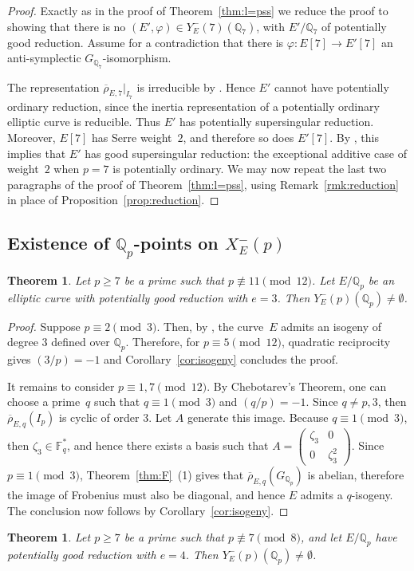 \documentclass[12pt]{amsart}
\numberwithin{equation}{section}
\newtheorem{theorem}[equation]{Theorem}
\theoremstyle{definition}
\newcommand{\F}{\mathbb{F}}
\newcommand{\Q}{\mathbb{Q}}
\newcommand{\rhobar}{{\overline{\rho}}}
\newcommand{\Xp}{X_E^{-}(p)}
\begin{document}
\begin{proof}
Exactly as in the proof of Theorem~\ref{thm:l=pss} we reduce the proof to showing that there is no 
$(E',\varphi)\in Y_E^-(7)(\Q_7)$, with $E'/\Q_7$ of potentially good reduction. Assume for a contradiction that there is $\varphi:E[7] \to E'[7]$ an anti-symplectic $G_{\Q_7}$-isomorphism.

The representation \(\overline{\rho}_{E,7}|_{I_7}\)  is irreducible by
\cite[Proposition~12]{Serre2}. Hence $E'$ cannot have potentially
ordinary reduction, since the inertia representation of a potentially
ordinary elliptic curve is reducible. Thus $E'$ has potentially
supersingular reduction. Moreover, $E[7]$ has Serre weight~$2$, and
therefore so does $E'[7]$. By \cite[Th\'eor\`eme~1 and Lemme 2]{Kraus1997},
this implies that $E'$ has good supersingular reduction: the exceptional additive
case of weight~$2$ when $p=7$ is potentially ordinary. 
We may now repeat the last two paragraphs of the proof of
Theorem~\ref{thm:l=pss}, using Remark~\ref{rmk:reduction} in place of Proposition~\ref{prop:reduction}.
\end{proof}

\subsection{Existence of $\Q_p$-points on $\Xp$} 

\begin{theorem}\label{thm:l=pe3}
Let $p\geq 7$ be a prime such that $p\not\equiv 11 \pmod{12} $. Let $E/\Q_p$
be an elliptic curve with potentially good reduction with $e=3$. Then $Y_E^-(p)(\Q_p) \neq \emptyset$.
\end{theorem}
\begin{proof}
Suppose $p \equiv 2 \pmod{3}$. Then, by \cite[Proposition~10]{symplectic}, the curve~\(E\) admits an isogeny of degree \(3\) defined over $\Q_p$. 
Therefore, for \(p\equiv5 \pmod{12}\), quadratic reciprocity gives
$(3/p)=-1$
and Corollary~\ref{cor:isogeny} concludes the proof.

It remains to consider \(p\equiv1, 7\pmod{12}\). 
By Chebotarev's Theorem, one can choose a prime~$q$ such that $q\equiv1\pmod3$ and $(q/p)=-1$.
Since \(q\neq p,3\), then $\rhobar_{E,q}(I_p)$ is cyclic of
order \(3\). Let $A$ generate this image. Because
\(q\equiv1\pmod3\), then \(\zeta_3 \in\F_q^*\), and hence there exists a basis such that 
$ A=\begin{pmatrix}
  \zeta_3&0\\
  0&\zeta_3^2
 \end{pmatrix}$.
Since \(p\equiv1\pmod3\), Theorem~\ref{thm:F}~(1) gives that $\rhobar_{E,q}(G_{\Q_p})$ is abelian,
therefore the image of Frobenius must also be diagonal, and hence $E$ admits a $ q$-isogeny. The conclusion now follows by Corollary~\ref{cor:isogeny}.
\end{proof}
\begin{theorem}\label{thm:l=re4}
    Let $p\geq 7$ be a prime such that $p\not\equiv 7 \pmod{8} $, and let $E/\Q_p$
have potentially good reduction with $e=4$. Then $Y_E^-(p)(\Q_p) \neq \emptyset$.
\end{theorem}
\end{document}
